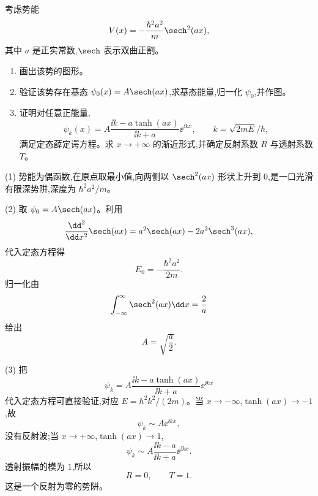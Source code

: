 \begin{question}
考虑势能
\[
V(x)=-\frac{\hbar^2a^2}{m}\sech^2(ax),
\]
其中 $a$ 是正实常数,$\sech$ 表示双曲正割。
\begin{enumerate}
\item 画出该势的图形。
\item 验证该势存在基态 $\psi_0(x)=A\sech(ax)$,求基态能量,归一化 $\psi_0$,并作图。
\item 证明对任意正能量,
\[
\psi_k(x)=A\frac{\ii k-a\tanh(ax)}{\ii k+a}\ee^{\ii kx},\qquad k=\sqrt{2mE}/\hbar,
\]
满足定态薛定谔方程。求 $x\to+\infty$ 的渐近形式,并确定反射系数 $R$ 与透射系数 $T$。
\end{enumerate}
\begin{solution}
(1) 势能为偶函数,在原点取最小值,向两侧以 $\sech^2(ax)$ 形状上升到 $0$,是一口光滑有限深势阱,深度为 $\hbar^2a^2/m$。

(2) 取 $\psi_0=A\sech(ax)$。利用
\[
\frac{\dd^2}{\dd x^2}\sech(ax)=a^2\sech(ax)-2a^2\sech^3(ax),
\]
代入定态方程得
\[
E_0=-\frac{\hbar^2a^2}{2m}.
\]
归一化由
\[
\int_{-\infty}^{\infty}\sech^2(ax)\dd x=\frac2a
\]
给出
\[
A=\sqrt{\frac a2}.
\]

(3) 把
\[
\psi_k=A\frac{\ii k-a\tanh(ax)}{\ii k+a}\ee^{\ii kx}
\]
代入定态方程可直接验证,对应 $E=\hbar^2k^2/(2m)$。当 $x\to-\infty$,$\tanh(ax)\to-1$,故
\[
\psi_k\sim A\ee^{\ii kx},
\]
没有反射波;当 $x\to+\infty$,$\tanh(ax)\to1$,
\[
\psi_k\sim A\frac{\ii k-a}{\ii k+a}\ee^{\ii kx}.
\]
透射振幅的模为 $1$,所以
\[
R=0,
\qquad T=1.
\]
这是一个反射为零的势阱。
\end{solution}
\end{question}

